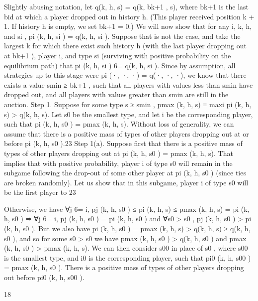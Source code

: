 \documentclass[10pt]{article}
\begin{document}
\begin{ReviewVerbatim}
Slightly abusing notation, let q(k, h, s) = q(k, bk+1 , s), where bk+1 is the last bid at which a player
dropped out in history h. (This player received position k + 1. If history h is empty, we set
bk+1 = 0.) We will now show that for any i, k, h, and si , pi (k, h, si ) = q(k, h, si ).
Suppose that is not the case, and take the largest k for which there exist such history h (with
the last player dropping out at bk+1 ), player i, and type si (surviving with positive probability on
the equilibrium path) that pi (k, h, si ) 6= q(k, h, si ). Since by assumption, all strategies up to this
stage were pi (·, ·, ·) = q(·, ·, ·), we know that there exists a value smin ≥ bk+1 , such that all players
with values less than smin have dropped out, and all players with values greater than smin are still
in the auction.
Step 1. Suppose for some type s ≥ smin , pmax (k, h, s) ≡ maxi pi (k, h, s) > q(k, h, s). Let s0
be the smallest type, and let i be the corresponding player, such that pi (k, h, s0 ) = pmax (k, h, s).
Without loss of generality, we can assume that there is a positive mass of types of other players
dropping out at or before pi (k, h, s0 ).23
Step 1(a). Suppose first that there is a positive mass of types of other players dropping out
at pi (k, h, s0 ) = pmax (k, h, s). That implies that with positive probability, player i of type s0 will
remain in the subgame following the drop-out of some other player at pi (k, h, s0 ) (since ties are
broken randomly). Let us show that in this subgame, player i of type s0 will be the first player to
23

Otherwise, we have ∀j 6= i, pj (k, h, s0 ) ≤ pi (k, h, s) ≤ pmax (k, h, s) = pi (k, h, s0 ) ⇒ ∀j 6= i, pj (k, h, s0 ) =
pi (k, h, s0 ) and ∀s0 > s0 , pj (k, h, s0 ) > pi (k, h, s0 ). But we also have pi (k, h, s0 ) = pmax (k, h, s) > q(k, h, s) ≥
q(k, h, s0 ), and so for some s0 > s0 we have pmax (k, h, s0 ) > q(k, h, s0 ) and pmax (k, h, s0 ) > pmax (k, h, s). We
can then consider s00 in place of s0 , where s00 is the smallest type, and i0 is the corresponding player, such that
pi0 (k, h, s00 ) = pmax (k, h, s0 ). There is a positive mass of types of other players dropping out before pi0 (k, h, s00 ).

18



\end{ReviewVerbatim}
\end{document}
